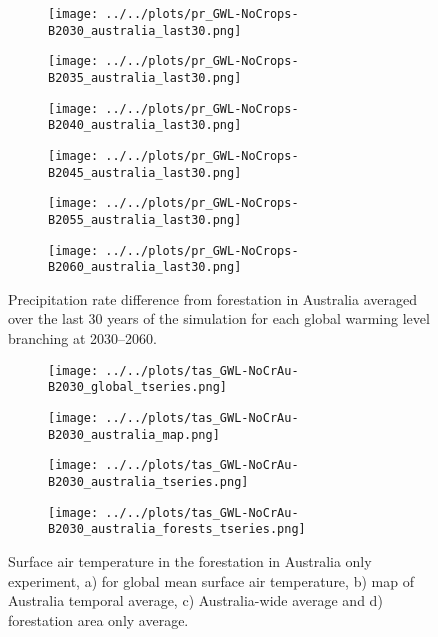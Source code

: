 \documentclass[]{article}
\begin{document}
\begin{figure}[H]
    \centering
    \begin{subfigure}[b]{0.4\linewidth}
        \texttt{[image: ../../plots/pr\_GWL-NoCrops-B2030\_australia\_last30.png]}
    \end{subfigure}
    \begin{subfigure}[b]{0.4\linewidth}
        \texttt{[image: ../../plots/pr\_GWL-NoCrops-B2035\_australia\_last30.png]}
    \end{subfigure}
    \begin{subfigure}[b]{0.4\linewidth}
        \texttt{[image: ../../plots/pr\_GWL-NoCrops-B2040\_australia\_last30.png]}
    \end{subfigure}
    \begin{subfigure}[b]{0.4\linewidth}
        \texttt{[image: ../../plots/pr\_GWL-NoCrops-B2045\_australia\_last30.png]}
    \end{subfigure}
    \begin{subfigure}[b]{0.4\linewidth}
        \texttt{[image: ../../plots/pr\_GWL-NoCrops-B2055\_australia\_last30.png]}
    \end{subfigure}
    \begin{subfigure}[b]{0.4\linewidth}
        \texttt{[image: ../../plots/pr\_GWL-NoCrops-B2060\_australia\_last30.png]}
    \end{subfigure}
    \caption{Precipitation rate difference from forestation in Australia averaged over the last 30 years of the simulation for each global warming level branching at 2030--2060.}
    \label{fig:pr_australia}
\end{figure}

\begin{figure}[H]
    \centering
    \begin{subfigure}[b]{0.4\linewidth}
        \texttt{[image: ../../plots/tas\_GWL-NoCrAu-B2030\_global\_tseries.png]}
    \end{subfigure}
    \begin{subfigure}[b]{0.4\linewidth}
        \texttt{[image: ../../plots/tas\_GWL-NoCrAu-B2030\_australia\_map.png]}
    \end{subfigure}
    \begin{subfigure}[b]{0.4\linewidth}
        \texttt{[image: ../../plots/tas\_GWL-NoCrAu-B2030\_australia\_tseries.png]}
    \end{subfigure}
    \begin{subfigure}[b]{0.4\linewidth}
        \texttt{[image: ../../plots/tas\_GWL-NoCrAu-B2030\_australia\_forests\_tseries.png]}
    \end{subfigure}
    \caption{Surface air temperature in the forestation in Australia only experiment, a) for global mean surface air temperature, b) map of Australia temporal average, c) Australia-wide average and d) forestation area only average.}
    \label{fig:tas_australia_only}

\end{figure}
\end{document}
